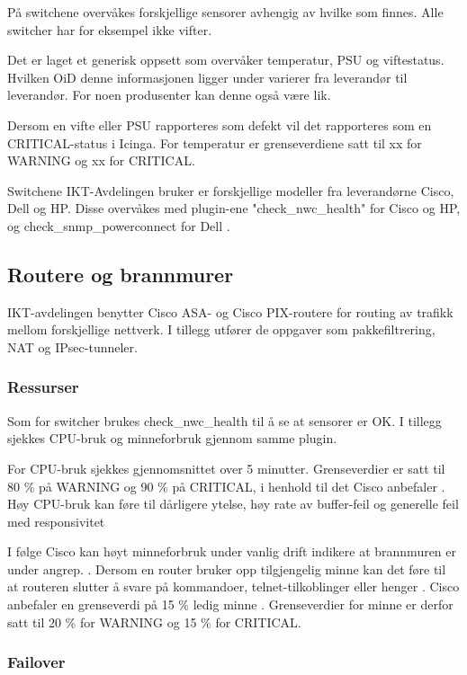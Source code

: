 På switchene overvåkes forskjellige sensorer avhengig av hvilke som finnes. Alle switcher har for eksempel ikke vifter.

Det er laget et generisk oppsett som overvåker temperatur, PSU og viftestatus. Hvilken OiD denne informasjonen ligger under varierer fra leverandør til leverandør. For noen produsenter kan denne også være lik. 

Dersom en vifte eller PSU rapporteres som defekt vil det rapporteres som en CRITICAL-status i Icinga. For temperatur er grenseverdiene satt til xx for WARNING og xx for CRITICAL.

Switchene IKT-Avdelingen bruker er forskjellige modeller fra leverandørne Cisco, Dell og HP. Disse overvåkes med plugin-ene "check\_nwc\_health" \cite{checknwc} for Cisco og HP, og check\_snmp\_powerconnect for Dell \cite{checkpowerconnect}.

\subsection{Routere og brannmurer}
IKT-avdelingen benytter Cisco ASA- og Cisco PIX-routere for routing av trafikk mellom forskjellige nettverk. I tillegg utfører de oppgaver som pakkefiltrering, NAT og IPsec-tunneler.
\subsubsection{Ressurser}

Som for switcher brukes check\_nwc\_health til å se at sensorer er OK. I tillegg sjekkes CPU-bruk og minneforbruk gjennom samme plugin. 

For CPU-bruk sjekkes gjennomsnittet over 5 minutter. Grenseverdier er satt til 80 \% på WARNING og 90 \% på CRITICAL, i henhold til det Cisco anbefaler \cite{ciscounifiedcommunication}. Høy CPU-bruk kan føre til dårligere ytelse, høy rate av buffer-feil og generelle feil med responsivitet \cite{ciscocpurouters}

I følge Cisco kan høyt minneforbruk under vanlig drift indikere at brannmuren er under angrep. \cite{ciscomem}. Dersom en router bruker opp tilgjengelig minne kan det føre til at routeren slutter å svare på kommandoer, telnet-tilkoblinger eller henger \cite{ciscomemproblem} . Cisco anbefaler en grenseverdi på 15 \% ledig minne \cite{ciscounifiedcommunication}. Grenseverdier for minne er derfor satt til 20 \% for WARNING og 15 \% for CRITICAL.

\subsubsection{Failover}

